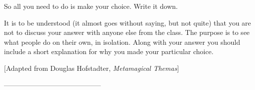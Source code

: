 So all you need to do is make your choice. Write it down.

It is to be understood (it almost goes without saying, but not quite) that you are not to discuss your answer with anyone else from the class. The purpose is to see what people do on their own, in isolation. Along with your answer you should include a short explanation for why you made your particular choice.





[Adapted from Douglas Hofstadter, {\it Metamagical Themas}]

------------------------------------------
\vspace{1in}

